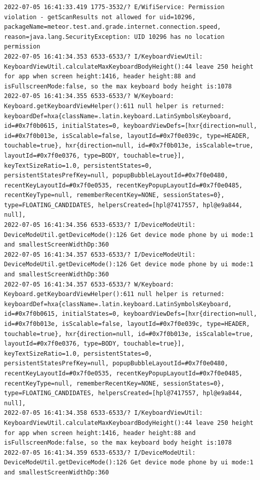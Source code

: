 \documentclass[a4paper,12pt]{book}
\begin{document}
\begin{lstlisting}
2022-07-05 16:41:33.419 1775-3532/? E/WifiService: Permission violation - getScanResults not allowed for uid=10296, packageName=meteor.test.and.grade.internet.connection.speed, reason=java.lang.SecurityException: UID 10296 has no location permission
2022-07-05 16:41:34.353 6533-6533/? I/KeyboardViewUtil: KeyboardViewUtil.calculateMaxKeyboardBodyHeight():44 leave 250 height for app when screen height:1416, header height:88 and isFullscreenMode:false, so the max keyboard body height is:1078
2022-07-05 16:41:34.355 6533-6533/? W/Keyboard: Keyboard.getKeyboardViewHelper():611 null helper is returned: keyboardDef=hxa{className=.latin.keyboard.LatinSymbolsKeyboard, id=#0x7f0b0615, initialStates=0, keyboardViewDefs=[hxr{direction=null, id=#0x7f0b013e, isScalable=false, layoutId=#0x7f0e039c, type=HEADER, touchable=true}, hxr{direction=null, id=#0x7f0b013e, isScalable=true, layoutId=#0x7f0e0376, type=BODY, touchable=true}], keyTextSizeRatio=1.0, persistentStates=0, persistentStatesPrefKey=null, popupBubbleLayoutId=#0x7f0e0480, recentKeyLayoutId=#0x7f0e0535, recentKeyPopupLayoutId=#0x7f0e0485, recentKeyType=null, rememberRecentKey=NONE, sessionStates=0}, type=FLOATING_CANDIDATES, helpersCreated=[hpl@7417557, hpl@e9a844, null], 
2022-07-05 16:41:34.356 6533-6533/? I/DeviceModeUtil: DeviceModeUtil.getDeviceMode():126 Get device mode phone by ui mode:1 and smallestScreenWidthDp:360
2022-07-05 16:41:34.357 6533-6533/? I/DeviceModeUtil: DeviceModeUtil.getDeviceMode():126 Get device mode phone by ui mode:1 and smallestScreenWidthDp:360
2022-07-05 16:41:34.357 6533-6533/? W/Keyboard: Keyboard.getKeyboardViewHelper():611 null helper is returned: keyboardDef=hxa{className=.latin.keyboard.LatinSymbolsKeyboard, id=#0x7f0b0615, initialStates=0, keyboardViewDefs=[hxr{direction=null, id=#0x7f0b013e, isScalable=false, layoutId=#0x7f0e039c, type=HEADER, touchable=true}, hxr{direction=null, id=#0x7f0b013e, isScalable=true, layoutId=#0x7f0e0376, type=BODY, touchable=true}], keyTextSizeRatio=1.0, persistentStates=0, persistentStatesPrefKey=null, popupBubbleLayoutId=#0x7f0e0480, recentKeyLayoutId=#0x7f0e0535, recentKeyPopupLayoutId=#0x7f0e0485, recentKeyType=null, rememberRecentKey=NONE, sessionStates=0}, type=FLOATING_CANDIDATES, helpersCreated=[hpl@7417557, hpl@e9a844, null], 
2022-07-05 16:41:34.358 6533-6533/? I/KeyboardViewUtil: KeyboardViewUtil.calculateMaxKeyboardBodyHeight():44 leave 250 height for app when screen height:1416, header height:88 and isFullscreenMode:false, so the max keyboard body height is:1078
2022-07-05 16:41:34.359 6533-6533/? I/DeviceModeUtil: DeviceModeUtil.getDeviceMode():126 Get device mode phone by ui mode:1 and smallestScreenWidthDp:360

\end{lstlisting}
\end{document}
